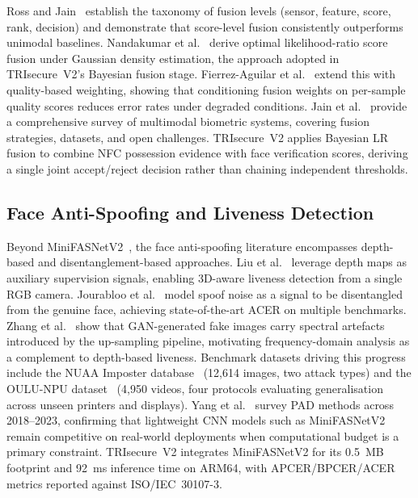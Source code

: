 \documentclass[pdflatex,sn-mathphys-num]{sn-jnl}%
\theoremstyle{thmstyleone}%
\theoremstyle{thmstyletwo}%
\theoremstyle{thmstylethree}%
\begin{document}
Ross and Jain~\cite{ross2003multimodal} establish the taxonomy of fusion levels
(sensor, feature, score, rank, decision) and demonstrate that score-level fusion
consistently outperforms unimodal baselines. Nandakumar et
al.~\cite{nandakumar2008fusion} derive optimal likelihood-ratio score fusion
under Gaussian density estimation, the approach adopted in TRIsecure~V2's
Bayesian fusion stage. Fierrez-Aguilar et al.~\cite{fierrez2005fusion} extend
this with quality-based weighting, showing that conditioning fusion weights on
per-sample quality scores reduces error rates under degraded conditions. Jain et
al.~\cite{jain2011multimodal} provide a comprehensive survey of multimodal
biometric systems, covering fusion strategies, datasets, and open challenges.
TRIsecure~V2 applies Bayesian LR fusion to combine NFC possession evidence with
face verification scores, deriving a single joint accept/reject decision rather
than chaining independent thresholds.

\subsection{Face Anti-Spoofing and Liveness Detection}

Beyond MiniFASNetV2~\cite{zhang2020minifasnet}, the face anti-spoofing
literature encompasses depth-based and disentanglement-based approaches. Liu et
al.~\cite{liu2018learning} leverage depth maps as auxiliary supervision signals,
enabling 3D-aware liveness detection from a single RGB camera. Jourabloo et
al.~\cite{jourabloo2018desp} model spoof noise as a signal to be disentangled
from the genuine face, achieving state-of-the-art ACER on multiple benchmarks.
Zhang et al.~\cite{zhang2019autoGAN} show that GAN-generated fake images carry
spectral artefacts introduced by the up-sampling pipeline, motivating
frequency-domain analysis as a complement to depth-based liveness. Benchmark
datasets driving this progress include the NUAA Imposter
database~\cite{tan2010nuaa} (12,614 images, two attack types) and the OULU-NPU
dataset~\cite{boulkenafet2017oulu} (4,950 videos, four protocols evaluating
generalisation across unseen printers and displays). Yang et
al.~\cite{yang2023pad_survey} survey PAD methods across 2018--2023, confirming
that lightweight CNN models such as MiniFASNetV2 remain competitive on
real-world deployments when computational budget is a primary constraint.
TRIsecure~V2 integrates MiniFASNetV2 for its 0.5~MB footprint and 92~ms
inference time on ARM64, with APCER/BPCER/ACER metrics reported against
ISO/IEC~30107-3.
\end{document}
